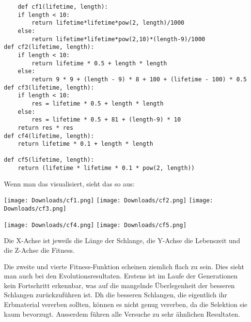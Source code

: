 \documentclass[11pt,a4paper,ngerman]{article}
\begin{document}

\begin{addmargin}[2em]{0em}
\begin{lstlisting}
    def cf1(lifetime, length):
    if length < 10:
        return lifetime*lifetime*pow(2, length)/1000
    else:
        return lifetime*lifetime*pow(2,10)*(length-9)/1000
def cf2(lifetime, length):
    if length < 10:
        return lifetime * 0.5 + length * length
    else:
        return 9 * 9 + (length - 9) * 8 + 100 + (lifetime - 100) * 0.5
def cf3(lifetime, length):
    if length < 10:
        res = lifetime * 0.5 + length * length
    else:
        res = lifetime * 0.5 + 81 + (length-9) * 10
    return res * res
def cf4(lifetime, length):
    return lifetime * 0.1 + length * length

def cf5(lifetime, length):
    return (lifetime * lifetime * 0.1 * pow(2, length))
\end{lstlisting}
\end{addmargin}

Wenn man das visualisiert, sieht das so aus:

\begin{center}
    \texttt{[image: Downloads/cf1.png]}
    \texttt{[image: Downloads/cf2.png]}
    \texttt{[image: Downloads/cf3.png]}
\end{center}


\begin{center}
    \texttt{[image: Downloads/cf4.png]}
    \texttt{[image: Downloads/cf5.png]}
\end{center}

Die X-Achse ist jeweils die Länge der Schlange, die Y-Achse die Lebenszeit und die Z-Achse die Fitness.

\bigskip
Die zweite und vierte Fitness-Funktion scheinen ziemlich flach zu sein. Dies sieht man auch bei den Evolutionsresultaten. Erstens ist im Laufe der Generationen kein Fortschritt erkennbar, was auf die mangelnde Überlegenheit der besseren Schlangen zurückzuführen ist. Dh die besseren Schlangen, die eigentlich ihr Erbmaterial vererben sollten, können es nicht genug vererben, da die Selektion sie kaum bevorzugt. Ausserdem führen alle Versuche zu sehr ähnlichen Resultaten.
\end{document}
